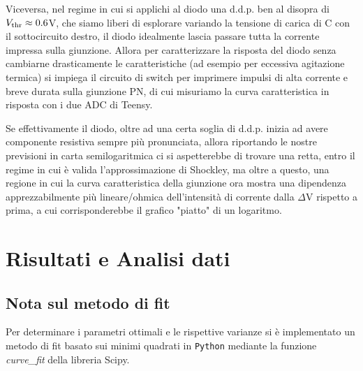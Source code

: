 \documentclass{article}[a4paper, oneside, 11pt]
\begin{document}
Viceversa, nel regime in cui si applichi al diodo una d.d.p. ben al disopra di $V_{\rm thr} \approx 0.6 $V, che siamo liberi di esplorare variando la tensione di carica di C con il sottocircuito destro, il diodo idealmente lascia passare tutta la corrente impressa sulla giunzione. Allora per caratterizzare la risposta del diodo senza cambiarne drasticamente le caratteristiche (ad esempio per eccessiva agitazione termica) si impiega il circuito di switch per imprimere impulsi di alta corrente e breve durata sulla giunzione PN, di cui misuriamo la curva caratteristica in risposta con i due ADC di Teensy. 

Se effettivamente il diodo, oltre ad una certa soglia di d.d.p. inizia ad avere componente resistiva sempre più pronunciata, allora riportando le nostre previsioni in carta semilogaritmica ci si aspetterebbe di trovare una retta, entro il regime in cui è valida l'approssimazione di Shockley, ma oltre a questo, una regione in cui la curva caratteristica della giunzione ora mostra una dipendenza apprezzabilmente più lineare/ohmica dell'intensità di corrente dalla $\Delta$V rispetto a prima, a cui corrisponderebbe il grafico "piatto" di un logaritmo.  \section{Risultati e Analisi dati}
\subsection{Nota sul metodo di fit}
Per determinare i parametri ottimali e le rispettive varianze si \`e implementato un metodo di fit basato sui minimi quadrati in \verb+Python+ mediante la funzione \emph{curve\_fit} della libreria Scipy\cite{scipy}.
\pagebreak


\end{document}
